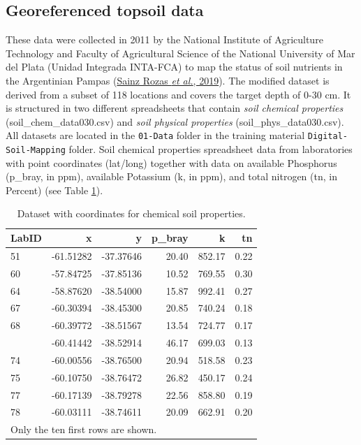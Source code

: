 \documentclass[
  10pt,
  b5paper,
  oneside]{book}
\begin{document}
\hypertarget{georeferenced-topsoil-data}{%
\subsection{Georeferenced topsoil data}\label{georeferenced-topsoil-data}}

These data were collected in 2011 by the National Institute of Agriculture Technology and Faculty of Agricultural Science of the National University of Mar del Plata (Unidad Integrada INTA-FCA) to map the status of soil nutrients in the Argentinian Pampas (\protect\hyperlink{ref-sainz2019}{Sainz Rozas \emph{et al.}, 2019}). The modified dataset is derived from a subset of 118 locations and covers the target depth of 0-30 cm. It is structured in two different spreadsheets that contain \emph{soil chemical properties} (soil\_chem\_data030.csv) and \emph{soil physical properties} (soil\_phys\_data030.csv). All datasets are located in the \texttt{01-Data} folder in the training material \texttt{Digital-Soil-Mapping} folder.
Soil chemical properties spreadsheet data from laboratories with point coordinates (lat/long) together with data on available Phosphorus (p\_bray, in ppm), available Potassium (k, in ppm), and total nitrogen (tn, in Percent) (see Table \ref{tab:table2}).

\begin{table}

\caption{\label{tab:table2}Dataset with coordinates for chemical soil properties.}
\centering
\begin{tabular}[t]{lrrrrr}
\toprule
LabID & x & y & p\_bray & k & tn\\
\midrule
51 & -61.51282 & -37.37646 & 20.40 & 852.17 & 0.22\\
60 & -57.84725 & -37.85136 & 10.52 & 769.55 & 0.30\\
64 & -58.87620 & -38.54000 & 15.87 & 992.41 & 0.27\\
67 & -60.30394 & -38.45300 & 20.85 & 740.24 & 0.18\\
68 & -60.39772 & -38.51567 & 13.54 & 724.77 & 0.17\\
\addlinespace
69 & -60.41442 & -38.52914 & 46.17 & 699.03 & 0.13\\
74 & -60.00556 & -38.76500 & 20.94 & 518.58 & 0.23\\
75 & -60.10750 & -38.76472 & 26.82 & 450.17 & 0.24\\
77 & -60.17139 & -38.79278 & 22.56 & 858.80 & 0.19\\
78 & -60.03111 & -38.74611 & 20.09 & 662.91 & 0.20\\
\bottomrule
\multicolumn{6}{l}{\rule{0pt}{1em}Only the ten first rows are shown.}\\
\end{tabular}
\end{table}
\end{document}

